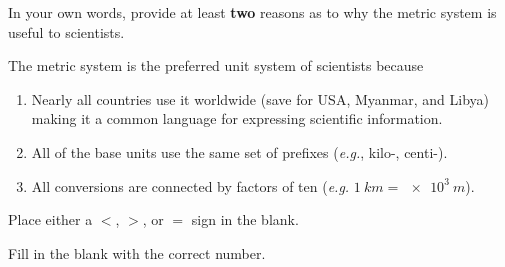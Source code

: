 \begin{questions}
\question In your own words, provide at least \textbf{two} reasons as to why the metric system is useful to scientists.  
\ifprintanswers
\begin{solution}
The metric system is the preferred unit system of scientists because
\begin{enumerate}
\item Nearly all countries use it worldwide (save for USA, Myanmar, and Libya) making it a common language for expressing scientific information.
\item All of the base units use the same set of prefixes (\emph{e.g.}, kilo-, centi-).
\item All conversions are connected by factors of ten (\emph{e.g.} $\SI{1}{km}=\SI{e3}{m}$).
\end{enumerate} 
\end{solution} 
\else
\qsppp
\fi


\question
Place either a $<$, $>$, or $=$ sign in the blank.


\question
Fill in the blank with the correct number.

\end{questions}
